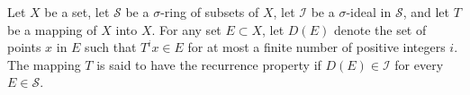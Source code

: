 Let $X$ be a set, let $\mathcal{S}$ be a $\sigma$-ring of subsets of $X$, let $\mathcal{I}$ be a $\sigma$-ideal in $\mathcal{S}$, and let $T$ be a mapping of $X$ into $X$. For any set $E \subset X$, let $D(E)$ denote the set of points $x$ in $E$ such that $T^i x \in E$ for at most a finite number of positive integers $i$. The mapping $T$ is said to have the recurrence property if $D(E) \in \mathcal{I}$ for every $E \in \mathcal{S}$.